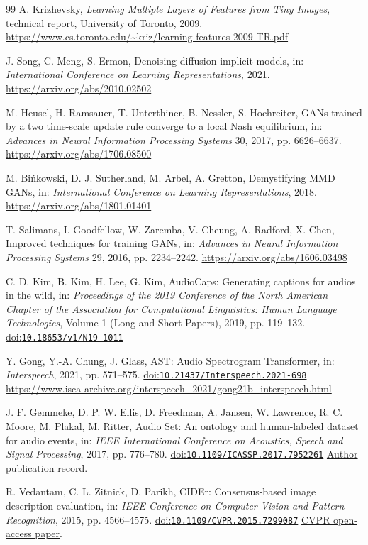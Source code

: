 \documentclass[10pt,a4paper,twocolumn]{article}
\providecommand{\doi}[1]{%
  \href{https://doi.org/#1}{doi:\nolinkurl{#1}}}
\begin{document}
\begin{thebibliography}{99}
A. Krizhevsky,
\emph{Learning Multiple Layers of Features from Tiny Images},
technical report, University of Toronto, 2009.
\url{https://www.cs.toronto.edu/~kriz/learning-features-2009-TR.pdf}

J. Song, C. Meng, S. Ermon,
Denoising diffusion implicit models,
in: \emph{International Conference on Learning Representations}, 2021.
\url{https://arxiv.org/abs/2010.02502}

M. Heusel, H. Ramsauer, T. Unterthiner, B. Nessler, S. Hochreiter,
GANs trained by a two time-scale update rule converge
to a local Nash equilibrium,
in: \emph{Advances in Neural Information Processing Systems}
30, 2017, pp. 6626--6637.
\url{https://arxiv.org/abs/1706.08500}

M. Bi\'nkowski, D. J. Sutherland, M. Arbel, A. Gretton,
Demystifying MMD GANs,
in: \emph{International Conference on Learning Representations}, 2018.
\url{https://arxiv.org/abs/1801.01401}

T. Salimans, I. Goodfellow, W. Zaremba, V. Cheung,
A. Radford, X. Chen,
Improved techniques for training GANs,
in: \emph{Advances in Neural Information Processing Systems}
29, 2016, pp. 2234--2242.
\url{https://arxiv.org/abs/1606.03498}

C. D. Kim, B. Kim, H. Lee, G. Kim,
AudioCaps: Generating captions for audios in the wild,
in: \emph{Proceedings of the 2019 Conference of the North American Chapter of the Association for Computational Linguistics: Human Language Technologies}, Volume 1 (Long and Short Papers), 2019, pp. 119--132.
\doi{10.18653/v1/N19-1011}

Y. Gong, Y.-A. Chung, J. Glass,
AST: Audio Spectrogram Transformer,
in: \emph{Interspeech}, 2021, pp. 571--575.
\doi{10.21437/Interspeech.2021-698}
\url{https://www.isca-archive.org/interspeech_2021/gong21b_interspeech.html}

J. F. Gemmeke, D. P. W. Ellis, D. Freedman, A. Jansen,
W. Lawrence, R. C. Moore, M. Plakal, M. Ritter,
Audio Set: An ontology and human-labeled dataset for audio events,
in: \emph{IEEE International Conference on Acoustics,
Speech and Signal Processing}, 2017, pp. 776--780.
\doi{10.1109/ICASSP.2017.7952261}
\href{https://research.google/pubs/audio-set-an-ontology-and-human-labeled-dataset-for-audio-events/}
{Author publication record}.

R. Vedantam, C. L. Zitnick, D. Parikh,
CIDEr: Consensus-based image description evaluation,
in: \emph{IEEE Conference on Computer Vision and Pattern Recognition},
2015, pp. 4566--4575.
\doi{10.1109/CVPR.2015.7299087}
\href{https://openaccess.thecvf.com/content_cvpr_2015/html/Vedantam_CIDEr_Consensus-Based_Image_2015_CVPR_paper.html}
{CVPR open-access paper}.


\end{thebibliography}
\end{document}
